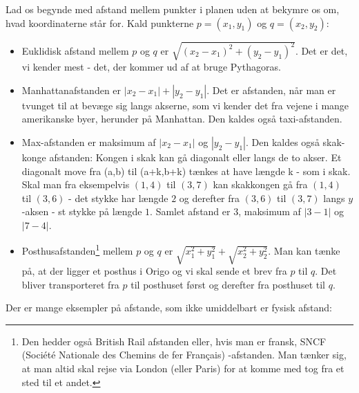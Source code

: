 \documentclass[a4paper, 12pt]{article}
\theoremstyle{remark}
\begin{document}
Lad os begynde med afstand mellem punkter i planen uden at bekymre os om, hvad koordinaterne står for. Kald punkterne $p=(x_1,y_1)$ og $q=(x_2,y_2)$: 
\begin{itemize}
\item Euklidisk afstand mellem $p$ og $q$ er $\sqrt{(x_2-x_1)^2+(y_2-y_1)^2}$. Det er det, vi kender mest - det, der kommer ud af at bruge Pythagoras.
\item Manhattanafstanden er $|x_2-x_1|+|y_2-y_1|$. Det er afstanden, når man er tvunget til at bevæge sig langs akserne, som vi kender det fra vejene i mange amerikanske byer, herunder på Manhattan. Den kaldes også taxi-afstanden. 
\item Max-afstanden er maksimum af   $|x_2-x_1|$ og $|y_2-y_1|$. Den kaldes også skak-konge afstanden: Kongen i skak kan gå diagonalt eller langs de to akser. Et diagonalt move fra (a,b) til (a+k,b+k) tænkes at have længde k - som i skak. Skal man fra eksempelvis $(1,4)$ til $(3,7)$ kan skakkongen gå fra $(1,4)$ til $(3,6)$ - det stykke har længde $2$ og derefter fra $(3,6)$ til $(3,7)$ langs $y$-aksen - st stykke på længde $1$. Samlet afstand er $3$, maksimum af $|3-1|$ og $|7-4|$. 
\item Posthusafstanden\footnote{Den hedder også British Rail afstanden eller, hvis man er fransk, SNCF (Société Nationale des Chemins de fer Fran\c{c}ais) -afstanden. Man tænker sig, at man altid skal rejse via London (eller Paris) for at komme med tog fra et sted til et andet.} mellem $p$ og $q$ er $\sqrt{x_1^2+y_1^2}+\sqrt{x_2^2+y_2^2}$. Man kan tænke på, at der ligger et posthus i Origo og vi skal sende et brev fra $p$ til $q$. Det bliver transporteret fra $p$  til posthuset først og derefter fra posthuset til $q$.
\end{itemize}
Der er mange eksempler på afstande, som ikke umiddelbart er fysisk afstand:
\end{document}

